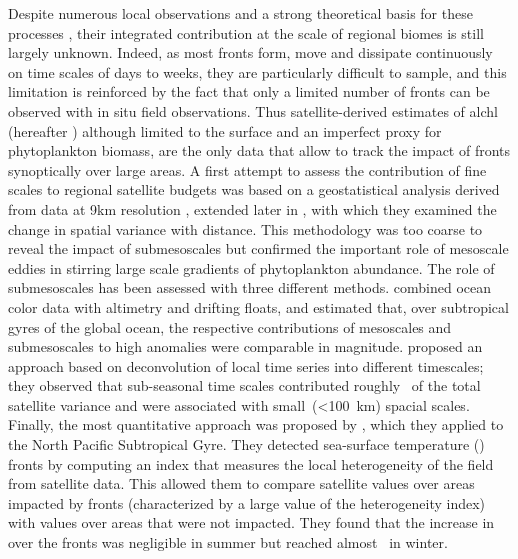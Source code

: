 Despite numerous local observations and a strong theoretical basis for these processes \parencite[e.g.\ recent studies by][]{marrec_2018, little_2018, verneil_2019, ruiz_2019, uchida_2020, kessouri_2020, tzortzis_2021}, their integrated contribution at the scale of regional biomes is still largely unknown.
Indeed, as most fronts form, move and dissipate continuously on time scales of days to weeks, they are particularly difficult to sample, and this limitation is reinforced by the fact that only a limited number of fronts can be observed with in situ field observations.
Thus satellite-derived estimates of al{chl} (hereafter ) although limited to the surface and an imperfect proxy for phytoplankton biomass, are the only data that allow to track the impact of fronts synoptically over large areas.
A first attempt to assess the contribution of fine scales to regional satellite  budgets was based on a geostatistical analysis derived from data at 9km resolution \parencite{doney_2003}, extended later in \textcite{glover_2018}, with which they examined the change in spatial variance with distance.
This methodology was too coarse to reveal the impact of submesoscales but confirmed the important role of mesoscale eddies in stirring large scale gradients of phytoplankton abundance.
The role of submesoscales has been assessed with three different methods.
\textcite{guo_2019} combined ocean color data with altimetry and drifting floats, and estimated that, over subtropical gyres of the global ocean, the respective contributions of mesoscales and submesoscales to high  anomalies were comparable in magnitude.
\textcite{keerthi_2022} proposed an approach based on deconvolution of local  time series into different timescales; they observed that sub-seasonal time scales contributed roughly~ of the total satellite  variance and were associated with small~(\qty{<100}{\km}) spacial scales.
Finally, the most quantitative approach was proposed by \textcite{liu_2016}, which they applied to the North Pacific Subtropical Gyre.
They detected sea-surface temperature () fronts by computing an index that measures the local heterogeneity of the  field from satellite  data.
This allowed them to compare satellite  values over areas impacted by fronts (characterized by a large value of the heterogeneity index) with values over areas that were not impacted.
They found that the increase in  over the fronts was negligible in summer but reached almost~ in winter.

